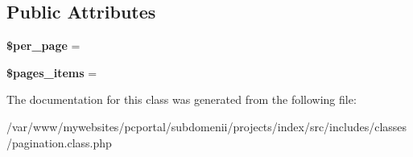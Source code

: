 \subsection*{Public Attributes}
\begin{DoxyCompactItemize}
\item 
\hypertarget{classpagination_ac871f7ad3e9b621b0eab884db14e8667}{
{\bfseries \$\-p\-e\-r\_\-\-p\-a\-g\-e} = }
\label{classpagination_ac871f7ad3e9b621b0eab884db14e8667}

\item 
\hypertarget{classpagination_af0b60c275c08a23d8790da7c3b35fa0a}{
{\bfseries \$\-p\-a\-g\-e\-s\_\-\-i\-t\-e\-m\-s} = }
\label{classpagination_af0b60c275c08a23d8790da7c3b35fa0a}

\end{DoxyCompactItemize}


The documentation for this class was generated from the following file:\begin{DoxyCompactItemize}
\item 
\-/\-v\-a\-r\-/\-w\-w\-w\-/\-m\-y\-w\-e\-b\-s\-i\-t\-e\-s\-/\-p\-c\-p\-o\-r\-t\-a\-l\-/\-s\-u\-b\-d\-o\-m\-e\-n\-i\-i\-/\-p\-r\-o\-j\-e\-c\-t\-s\-/\-i\-n\-d\-e\-x\-/\-s\-r\-c\-/\-i\-n\-c\-l\-u\-d\-e\-s\-/\-c\-l\-a\-s\-s\-e\-s\-/\-p\-a\-g\-i\-n\-a\-t\-i\-o\-n\-.\-c\-l\-a\-s\-s\-.\-p\-h\-p\end{DoxyCompactItemize}
